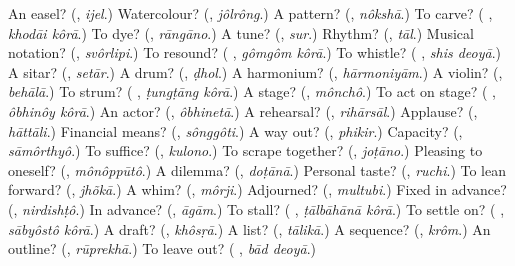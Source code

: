 \begin{tcolorbox}[breakable,colback=teal!4,colframe=teal!35!black,title={Before you move on}]
An easel? (\textbf{}, \emph{ijel}.) Watercolour? (\textbf{}, \emph{jôlrông}.) A pattern? (\textbf{}, \emph{nôkshā}.) To carve? (\textbf{ }, \emph{khodāi kôrā}.) To dye? (\textbf{}, \emph{rāngāno}.) A tune? (\textbf{}, \emph{sur}.) Rhythm? (\textbf{}, \emph{tāl}.) Musical notation? (\textbf{}, \emph{svôrlipi}.) To resound? (\textbf{ }, \emph{gômgôm kôrā}.) To whistle? (\textbf{ }, \emph{shis deoyā}.) A sitar? (\textbf{}, \emph{setār}.) A drum? (\textbf{}, \emph{ḍhol}.) A harmonium? (\textbf{}, \emph{hārmoniyām}.) A violin? (\textbf{}, \emph{behālā}.) To strum? (\textbf{ }, \emph{ṭungṭāng kôrā}.) A stage? (\textbf{}, \emph{mônchô}.) To act on stage? (\textbf{ }, \emph{ôbhinôy kôrā}.) An actor? (\textbf{}, \emph{ôbhinetā}.) A rehearsal? (\textbf{}, \emph{rihārsāl}.) Applause? (\textbf{}, \emph{hāttāli}.) Financial means? (\textbf{}, \emph{sônggôti}.) A way out? (\textbf{}, \emph{phikir}.) Capacity? (\textbf{}, \emph{sāmôrthyô}.) To suffice? (\textbf{}, \emph{kulono}.) To scrape together? (\textbf{}, \emph{joṭāno}.) Pleasing to oneself? (\textbf{}, \emph{mônôppūtô}.) A dilemma? (\textbf{}, \emph{doṭānā}.) Personal taste? (\textbf{}, \emph{ruchi}.) To lean forward? (\textbf{}, \emph{jhõkā}.) A whim? (\textbf{}, \emph{môrji}.) Adjourned? (\textbf{}, \emph{multubi}.) Fixed in advance? (\textbf{}, \emph{nirdishṭô}.) In advance? (\textbf{}, \emph{āgām}.) To stall? (\textbf{ }, \emph{ṭālbāhānā kôrā}.) To settle on? (\textbf{ }, \emph{sābyôstô kôrā}.) A draft? (\textbf{}, \emph{khôsṛā}.) A list? (\textbf{}, \emph{tālikā}.) A sequence? (\textbf{}, \emph{krôm}.) An outline? (\textbf{}, \emph{rūprekhā}.) To leave out? (\textbf{ }, \emph{bād deoyā}.)
\end{tcolorbox}
